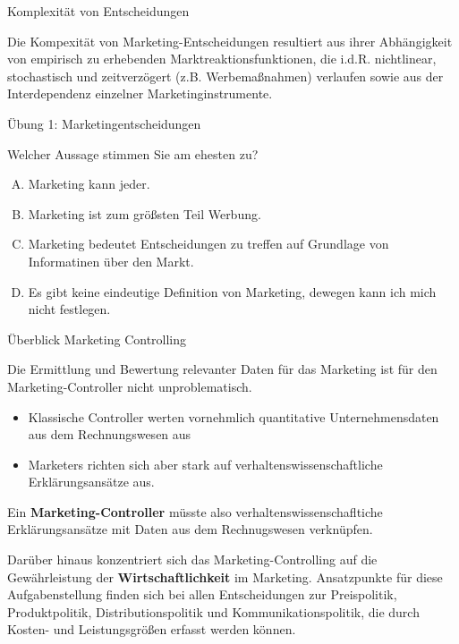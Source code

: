 \documentclass[12pt,ngerman,a4paper,ignorenonframetext,]{beamer}
\providecommand{\tightlist}{%
  \setlength{\itemsep}{0pt}\setlength{\parskip}{0pt}}
\begin{document}
\begin{frame}{Komplexität von Entscheidungen}
\protect\hypertarget{komplexitat-von-entscheidungen}{}

Die Kompexität von Marketing-Entscheidungen resultiert aus ihrer
Abhängigkeit von empirisch zu erhebenden Marktreaktionsfunktionen, die
i.\thinspace{}d.\thinspace{}R. nichtlinear, stochastisch und
zeitverzögert (z.\thinspace{}B. Werbemaßnahmen) verlaufen sowie aus der
Interdependenz einzelner Marketinginstrumente.

\end{frame}

\begin{frame}{Übung 1: Marketingentscheidungen}
\protect\hypertarget{ubung-1-marketingentscheidungen}{}

Welcher Aussage stimmen Sie am ehesten zu?

\begin{enumerate}
[A.]
\tightlist
\item
  Marketing kann jeder.
\item
  Marketing ist zum größsten Teil Werbung.
\item
  Marketing bedeutet Entscheidungen zu treffen auf Grundlage von
  Informatinen über den Markt.
\item
  Es gibt keine eindeutige Definition von Marketing, dewegen kann ich
  mich nicht festlegen.
\end{enumerate}


\end{frame}

\begin{frame}{Überblick Marketing Controlling}
\protect\hypertarget{uberblick-marketing-controlling}{}

Die Ermittlung und Bewertung relevanter Daten für das Marketing ist für
den Marketing-Controller nicht unproblematisch.

\begin{itemize}
\tightlist
\item
  Klassische Controller werten vornehmlich quantitative
  Unternehmensdaten aus dem Rechnungswesen aus
\item
  Marketers richten sich aber stark auf verhaltenswissenschaftliche
  Erklärungsansätze aus.
\end{itemize}

Ein \textbf{Marketing-Controller} müsste also
verhaltenswissenschafltiche Erklärungsansätze mit Daten aus dem
Rechnugswesen verknüpfen.

Darüber hinaus konzentriert sich das Marketing-Controlling auf die
Gewährleistung der \textbf{Wirtschaftlichkeit} im Marketing.
Ansatzpunkte für diese Aufgabenstellung finden sich bei allen
Entscheidungen zur Preispolitik, Produktpolitik, Distributionspolitik
und Kommunikationspolitik, die durch Kosten- und Leistungsgrößen erfasst
werden können.

\end{frame}
\end{document}
